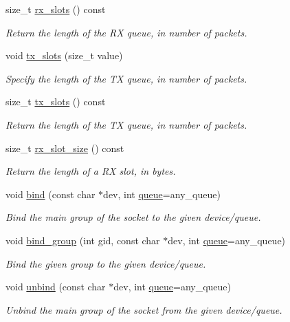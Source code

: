 \begin{DoxyCompactItemize}
size\+\_\+t \hyperlink{classpfq_1_1socket_a0f2205329249eaa7a6229980a744fd2a}{rx\+\_\+slots} () const 
\begin{DoxyCompactList}\small\item\em Return the length of the R\+X queue, in number of packets. \end{DoxyCompactList}\item 
void \hyperlink{classpfq_1_1socket_a019d15a072c043d6a1333ca0c836da4c}{tx\+\_\+slots} (size\+\_\+t value)
\begin{DoxyCompactList}\small\item\em Specify the length of the T\+X queue, in number of packets. \end{DoxyCompactList}\item 
size\+\_\+t \hyperlink{classpfq_1_1socket_a11b91a39fdae65cace365aa3583eba7d}{tx\+\_\+slots} () const 
\begin{DoxyCompactList}\small\item\em Return the length of the T\+X queue, in number of packets. \end{DoxyCompactList}\item 
size\+\_\+t \hyperlink{classpfq_1_1socket_a8e290b6b1105c22b538d38021d6bfb7d}{rx\+\_\+slot\+\_\+size} () const 
\begin{DoxyCompactList}\small\item\em Return the length of a R\+X slot, in bytes. \end{DoxyCompactList}\item 
void \hyperlink{classpfq_1_1socket_a3a0fc5c70e2d2615e29d06ac55007ed3}{bind} (const char $\ast$dev, int \hyperlink{classpfq_1_1queue}{queue}=any\+\_\+queue)
\begin{DoxyCompactList}\small\item\em Bind the main group of the socket to the given device/queue. \end{DoxyCompactList}\item 
void \hyperlink{classpfq_1_1socket_a4d4d44cc68af0290e3c494dcd10b1541}{bind\+\_\+group} (int gid, const char $\ast$dev, int \hyperlink{classpfq_1_1queue}{queue}=any\+\_\+queue)
\begin{DoxyCompactList}\small\item\em Bind the given group to the given device/queue. \end{DoxyCompactList}\item 
void \hyperlink{classpfq_1_1socket_af53d407f46ba2b4d143782ff7d585758}{unbind} (const char $\ast$dev, int \hyperlink{classpfq_1_1queue}{queue}=any\+\_\+queue)
\begin{DoxyCompactList}\small\item\em Unbind the main group of the socket from the given device/queue. \end{DoxyCompactList}\item 

\end{DoxyCompactItemize}

